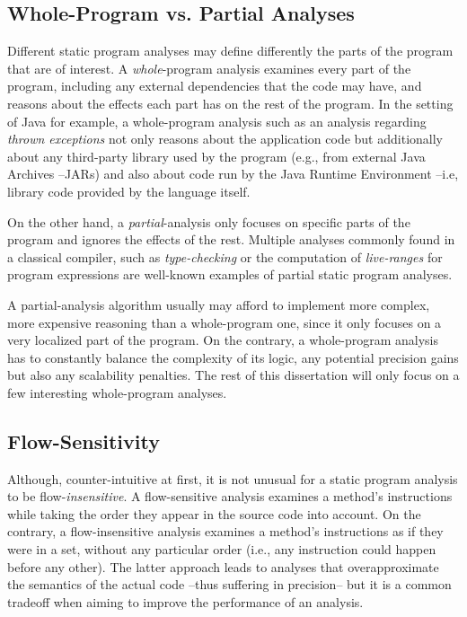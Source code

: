 \subsection{Whole-Program vs. Partial Analyses}

Different static program analyses may define differently the parts of the
program that are of interest. A \emph{whole}-program analysis examines every
part of the program, including any external dependencies that the code may
have, and reasons about the effects each part has on the rest of the program.
In the setting of Java for example, a whole-program analysis such as an
analysis regarding \emph{thrown exceptions} not only reasons about the
application code but additionally about any third-party library used by the
program (e.g., from external Java Archives --JARs) and also about code run by
the Java Runtime Environment --i.e, library code provided by the language
itself.

On the other hand, a \emph{partial}-analysis only focuses on specific parts of
the program and ignores the effects of the rest. Multiple analyses commonly
found in a classical compiler, such as \emph{type-checking} or the computation
of \emph{live-ranges} for program expressions are well-known examples of
partial static program analyses.

A partial-analysis algorithm usually may afford to implement more complex, more
expensive reasoning than a whole-program one, since it only focuses on a very
localized part of the program. On the contrary, a whole-program analysis has to
constantly balance the complexity of its logic,  any potential precision gains
but also any scalability penalties. The rest of this dissertation will only
focus on a few interesting whole-program analyses.

\subsection{Flow-Sensitivity} \label{flowSensitivity}

Although, counter-intuitive at first, it is not unusual for a static program
analysis to be flow-\emph{insensitive}. A flow-sensitive analysis examines a
method's instructions while taking the order they appear in the source code
into account. On the contrary, a flow-insensitive analysis examines a method's
instructions as if they were in a set, without any particular order (i.e., any
instruction could happen before any other). The latter approach leads to
analyses that overapproximate the semantics of the actual code --thus suffering
in precision-- but it is a common tradeoff when aiming to improve the
performance of an analysis.

